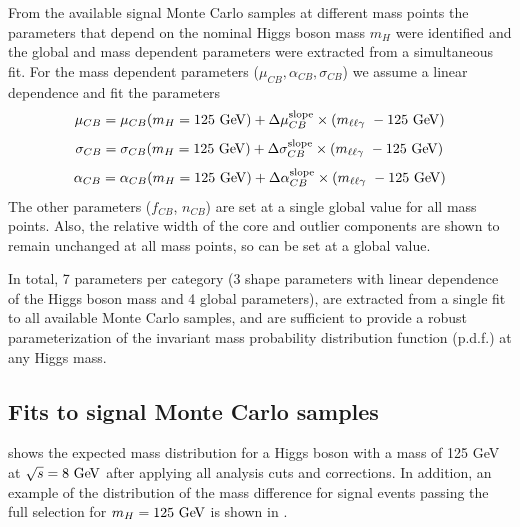 From the available signal Monte Carlo samples at different mass points the parameters
that depend on the nominal Higgs boson mass $m_H$ were identified and the global
and mass dependent parameters were extracted from a simultaneous fit. For the mass
dependent parameters ($\mu_{CB}, \alpha_{CB}, \sigma_{CB}$) we assume a linear
dependence and fit the parameters
\[
\mu_{CB} = \mu_{CB}(m_H = 125 \GeV) + \Delta \mu_{CB}^{\text{slope}} \times \left(\mllg - 125 \GeV \right)
\]
\[
\sigma_{CB} = \sigma_{CB}(m_H = 125 \GeV) + \Delta \sigma_{CB}^{\text{slope}} \times \left(\mllg - 125 \GeV \right)
\]
\[
\alpha_{CB} = \alpha_{CB}(m_H = 125 \GeV) + \Delta \alpha_{CB}^{\text{slope}} \times \left(\mllg - 125 \GeV \right)
\]
The other parameters ($f_{CB}$, $n_{CB}$) are set at a single global value for all
mass points. Also, the relative width of the core and outlier components are shown
to remain unchanged at all mass points, so can be set at a global value.

In total, 7 parameters per category (3 shape parameters with linear dependence of
the Higgs boson mass and 4 global parameters), are extracted from a single fit to
all available Monte Carlo samples, and are sufficient to provide a robust 
parameterization of the invariant mass probability distribution function (p.d.f.)
at any Higgs mass.

\subsection{Fits to signal Monte Carlo samples}

 shows the expected mass distribution for
a Higgs boson with a mass of 125 GeV at $\rts = 8 \GeV$ 
after applying all analysis cuts and corrections.
In addition, an example of the distribution of the mass difference 
\dm for signal events passing the full selection for $m_H = 125  \GeV$ is shown in 
.

